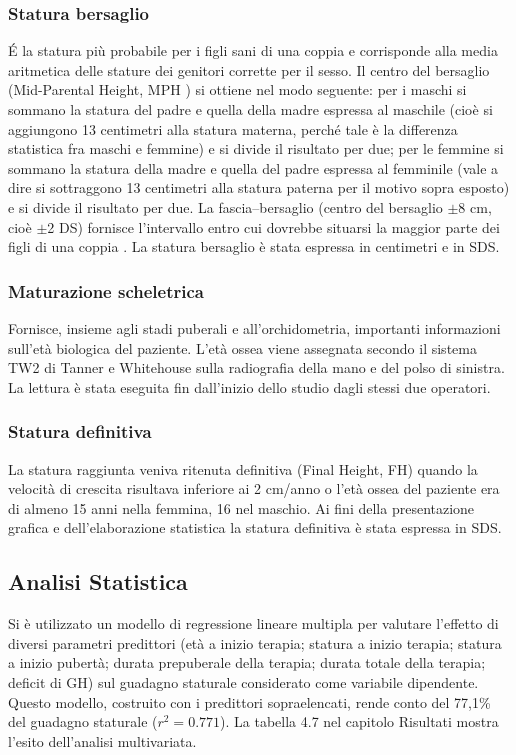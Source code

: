 \subsubsection*{Statura bersaglio}
\'E  la statura più probabile per i figli sani di una coppia e corrisponde alla media aritmetica delle stature dei genitori corrette per il sesso. Il centro del bersaglio (Mid-Parental Height, MPH ) si ottiene nel modo seguente: per i maschi si sommano la statura del padre e quella della madre espressa al maschile (cioè si aggiungono 13 centimetri alla statura materna, perché tale è la differenza statistica fra maschi e femmine) e si divide il risultato per due; per le femmine si sommano la statura della madre e quella del padre espressa al femminile (vale a dire si sottraggono 13 centimetri alla statura paterna per il motivo sopra esposto) e si divide il risultato per due. 
La fascia--bersaglio (centro del bersaglio $\pm$8 cm, cioè $\pm$2 DS) fornisce l'intervallo entro cui dovrebbe situarsi la maggior parte dei figli di una coppia \cite{tanner1990foetus}.
La statura bersaglio è stata espressa in centimetri e in SDS.


\subsubsection*{Maturazione scheletrica}
Fornisce, insieme agli stadi puberali e all'orchidometria, importanti informazioni sull'età biologica del paziente. L'età ossea viene assegnata secondo il sistema TW2 di Tanner e Whitehouse\cite{tanner1983assessment} sulla radiografia della mano e del polso di sinistra. La lettura è stata eseguita fin dall'inizio dello studio dagli stessi due operatori.


\subsubsection*{Statura definitiva}
La statura raggiunta veniva ritenuta definitiva (Final Height, FH) quando la velocità di crescita risultava inferiore ai 2 cm/anno o l'età ossea del paziente era di almeno 15 anni nella femmina, 16 nel maschio.
Ai fini della presentazione grafica e dell'elaborazione statistica la statura definitiva è stata espressa in SDS.




\subsection{Analisi Statistica}
Si è utilizzato un modello di regressione lineare multipla per valutare l'effetto di diversi parametri predittori (età a inizio terapia; statura a inizio terapia; statura a inizio pubertà; durata prepuberale della terapia; durata totale della terapia; deficit di GH) sul guadagno staturale considerato come variabile dipendente. 
Questo modello, costruito con i predittori sopraelencati, rende conto del 77,1\% del guadagno staturale ($r^2 = 0.771$).
La tabella 4.7 nel capitolo Risultati mostra l'esito dell'analisi multivariata. 
